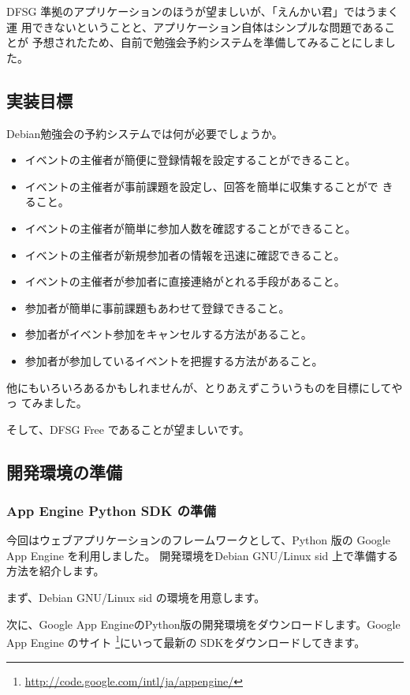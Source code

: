 \documentclass[mingoth,a4paper]{jsarticle}
\begin{document}
DFSG 準拠のアプリケーションのほうが望ましいが、「えんかい君」ではうまく運
用できないということと、アプリケーション自体はシンプルな問題であることが
予想されたため、自前で勉強会予約システムを準備してみることにしました。

\subsection{実装目標}

Debian勉強会の予約システムでは何が必要でしょうか。

\begin{itemize}
 \item イベントの主催者が簡便に登録情報を設定することができること。
 \item イベントの主催者が事前課題を設定し、回答を簡単に収集することがで
       きること。
 \item イベントの主催者が簡単に参加人数を確認することができること。
 \item イベントの主催者が新規参加者の情報を迅速に確認できること。
 \item イベントの主催者が参加者に直接連絡がとれる手段があること。
 \item 参加者が簡単に事前課題もあわせて登録できること。
 \item 参加者がイベント参加をキャンセルする方法があること。
 \item 参加者が参加しているイベントを把握する方法があること。
\end{itemize}

他にもいろいろあるかもしれませんが、とりあえずこういうものを目標にしてやっ
てみました。

そして、DFSG Free であることが望ましいです。

\subsection{開発環境の準備}

\subsubsection{App Engine Python SDK の準備}
今回はウェブアプリケーションのフレームワークとして、Python 版の Google
App Engine を利用しました。
開発環境をDebian GNU/Linux sid 上で準備する方法を紹介します。

まず、Debian GNU/Linux sid の環境を用意します。

次に、Google App EngineのPython版の開発環境をダウンロードします。Google
App Engine のサイト
\footnote{\url{http://code.google.com/intl/ja/appengine/}}にいって最新の
SDKをダウンロードしてきます。
\end{document}
